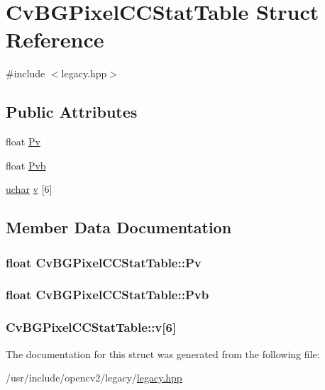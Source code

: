 \hypertarget{structCvBGPixelCCStatTable}{\section{Cv\-B\-G\-Pixel\-C\-C\-Stat\-Table Struct Reference}
\label{structCvBGPixelCCStatTable}
}


{\ttfamily \#include $<$legacy.\-hpp$>$}

\subsection*{Public Attributes}
\begin{DoxyCompactItemize}
\item 
float \hyperlink{structCvBGPixelCCStatTable_a16bf958d3dbf30a8a7a26948cc6611e3}{Pv}
\item 
float \hyperlink{structCvBGPixelCCStatTable_ad5793b967b14538dd2d4c09a9df0f756}{Pvb}
\item 
\hyperlink{core_2types__c_8h_a65f85814a8290f9797005d3b28e7e5fc}{uchar} \hyperlink{structCvBGPixelCCStatTable_a3e76f988fd3ab43fcf2ca7ca11635097}{v} \mbox{[}6\mbox{]}
\end{DoxyCompactItemize}


\subsection{Member Data Documentation}
\hypertarget{structCvBGPixelCCStatTable_a16bf958d3dbf30a8a7a26948cc6611e3}{
\subsubsection[{Pv}]{\setlength{\rightskip}{0pt plus 5cm}float Cv\-B\-G\-Pixel\-C\-C\-Stat\-Table\-::\-Pv}}\label{structCvBGPixelCCStatTable_a16bf958d3dbf30a8a7a26948cc6611e3}
\hypertarget{structCvBGPixelCCStatTable_ad5793b967b14538dd2d4c09a9df0f756}{
\subsubsection[{Pvb}]{\setlength{\rightskip}{0pt plus 5cm}float Cv\-B\-G\-Pixel\-C\-C\-Stat\-Table\-::\-Pvb}}\label{structCvBGPixelCCStatTable_ad5793b967b14538dd2d4c09a9df0f756}
\hypertarget{structCvBGPixelCCStatTable_a3e76f988fd3ab43fcf2ca7ca11635097}{
\subsubsection[{v}]{ Cv\-B\-G\-Pixel\-C\-C\-Stat\-Table\-::v\mbox{[}6\mbox{]}}}\label{structCvBGPixelCCStatTable_a3e76f988fd3ab43fcf2ca7ca11635097}


The documentation for this struct was generated from the following file\-:\begin{DoxyCompactItemize}
\item 
/usr/include/opencv2/legacy/\hyperlink{legacy_8hpp}{legacy.\-hpp}\end{DoxyCompactItemize}
